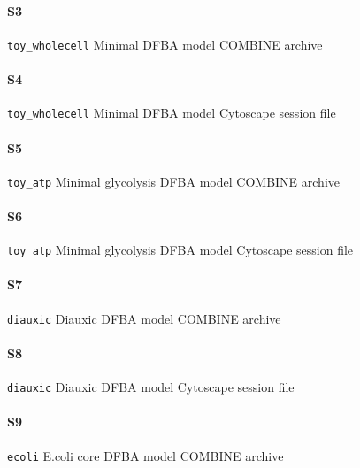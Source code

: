 \documentclass{bioinfo}
\begin{document}
\paragraph*{S3} \label{sup:toy_wholecell} \texttt{toy\_wholecell} Minimal DFBA model COMBINE archive
\paragraph*{S4} \label{sup:toy_wholecell_cytoscape} \texttt{toy\_wholecell} Minimal DFBA model Cytoscape session file
\paragraph*{S5} \label{sup:toy_atp} \texttt{toy\_atp} Minimal glycolysis DFBA model COMBINE archive
\paragraph*{S6} \label{sup:toy_atp_cytoscape} \texttt{toy\_atp} Minimal glycolysis DFBA model Cytoscape session file
\paragraph*{S7} \label{sup:diauxic_growth} \texttt{diauxic} Diauxic DFBA model COMBINE archive
\paragraph*{S8} \label{sup:diauxic_growth_cytoscape} \texttt{diauxic} Diauxic DFBA model Cytoscape session file
\paragraph*{S9} \label{sup:ecoli} \texttt{ecoli} E.coli core DFBA model COMBINE archive



\end{document}
